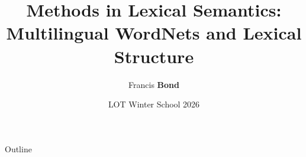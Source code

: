\documentclass{beamer}
\title[Open Multilingual Wordnet]{Methods in Lexical Semantics: 
\\ Multilingual WordNets and Lexical Structure}
\author{Francis \textbf{Bond}}
\institute[Palacký]{Department of Asian Studies,
\\  Palacký University, Olomouc, Czechia
\\[1.5ex] \url{<bond@ieee.org>}}
\date{LOT Winter School 2026} %
\begin{document}
\maketitle
\begin{frame}{Outline}
   \tableofcontents
 \end{frame}





  
\end{document}
